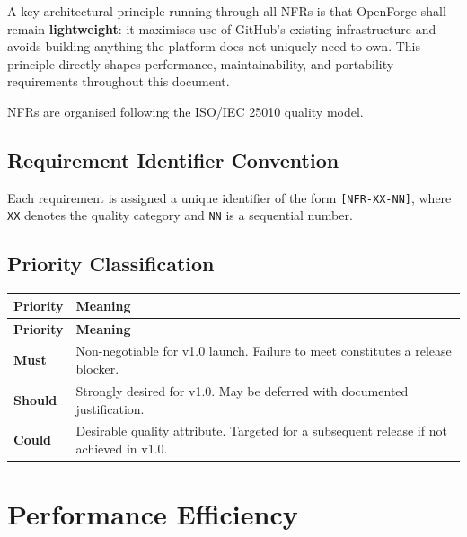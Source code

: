 \documentclass[12pt,a4paper]{article}
\begin{document}
A key architectural principle running through all NFRs is that OpenForge shall remain \textbf{lightweight}: it maximises use of GitHub's existing infrastructure and avoids building anything the platform does not uniquely need to own. This principle directly shapes performance, maintainability, and portability requirements throughout this document.

NFRs are organised following the ISO/IEC 25010 quality model.

\subsection{Requirement Identifier Convention}
Each requirement is assigned a unique identifier of the form \texttt{[NFR-XX-NN]}, where \texttt{XX} denotes the quality category and \texttt{NN} is a sequential number.

\subsection{Priority Classification}
\begin{longtable}{L{2.5cm} L{10.8cm}}
  \color{white}\bfseries Priority & \color{white}\bfseries Meaning \\
  \endfirsthead
  \color{white}\bfseries Priority & \color{white}\bfseries Meaning \\
  \endhead\hline
  \textbf{Must}   & Non-negotiable for v1.0 launch. Failure to meet constitutes a release blocker. \\
  \textbf{Should} & Strongly desired for v1.0. May be deferred with documented justification. \\
  \textbf{Could}  & Desirable quality attribute. Targeted for a subsequent release if not achieved in v1.0. \\
  \hline
\end{longtable}

\section{Performance Efficiency}
\end{document}
